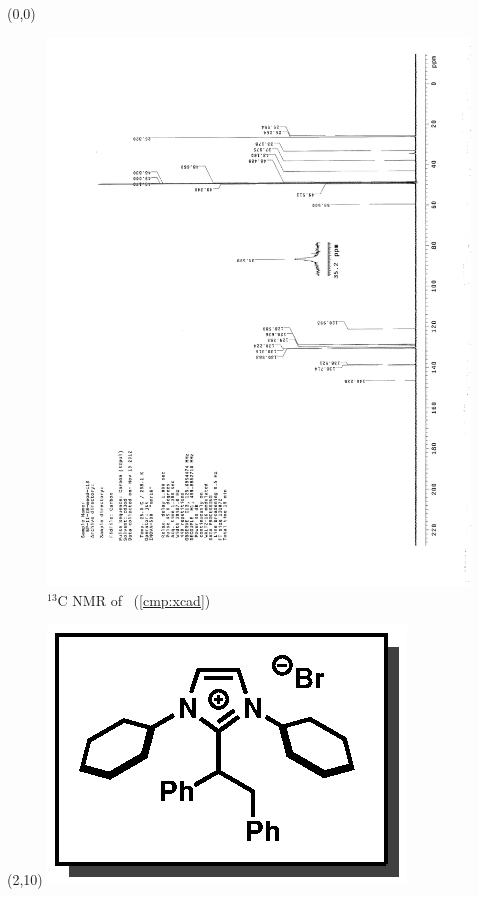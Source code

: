 \clearpage
\begin{textblock}{20}(0,0)
\begin{figure}[htb]
\caption{$^{13}$C NMR of  \CMPxcad\ (\ref{cmp:xcad})}
\includegraphics[scale=0.75, trim = 0mm 0mm 0mm 5mm,
clip]{chp_alkylation/images/nmr/xcadC}
\vspace{-100pt}
\end{figure}
\end{textblock}
\begin{textblock}{1}(2,10)
\includegraphics[scale=0.8, angle=90]{chp_alkylation/images/xcad}
\end{textblock}
